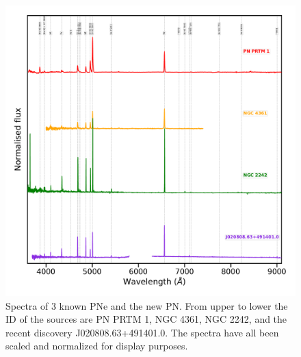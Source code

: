 \documentclass[fleqn,usenatbib]{mnras}
\begin{document}

\begin{figure}
\centering
\includegraphics[width=\linewidth]{Figs/spectra-compare.pdf}
\caption{Spectra of 3 known PNe and the new PN. From upper to lower the ID of the
  sources are PN PRTM 1, NGC 4361, NGC 2242, and the recent discovery
  J020808.63+491401.0. The spectra have all been scaled and normalized
  for display purposes.} 
  \label{fig:compare-spectra}
\end{figure}
\end{document}

